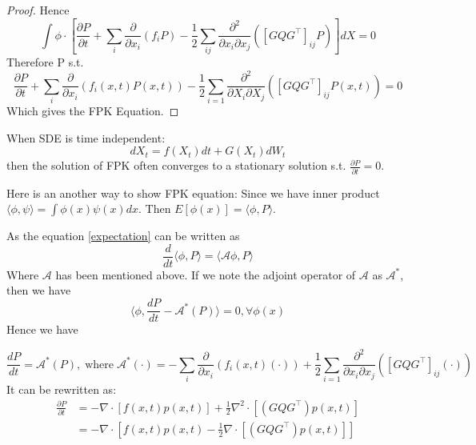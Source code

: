 \begin{proof}
    Hence $$\int \phi \cdot\left[\frac{\partial P}{\partial t}+\sum_{i} \frac{\partial}{\partial x_{i}}\left(f_{i} P\right)-\frac{1}{2} \sum_{i j} \frac{\partial^{2}}{\partial x_{i} \partial x_{j}}\left(\left[G Q G^{\top}\right]_{i j} P\right)\right] d X=0$$
    Therefore P s.t.    
    \begin{equation}
        \frac{\partial P}{\partial t}+\sum_{i} \frac{\partial}{\partial x_{i}}\left(f_{i}(x, t) P(x, t)\right)-\frac{1}{2} \sum_{i=1} \frac{\partial^{2}}{\partial X_{i} \partial X_{j}}\left(\left[G Q G^{\top}\right]_{i j} P\left(x,t\right)\right)=0
    \end{equation}
    Which gives the FPK Equation.
\end{proof}

\begin{remark}
    When SDE is time independent:  
    \begin{equation}
        d X_t=f(X_t) d t+G(X_t) d W_{t}  
    \end{equation}
    then the solution of FPK often converges to a stationary solution s.t.  $\frac{\partial P}{\partial t}=0$.
\end{remark}
Here is an another way to show FPK equation: Since we have inner product $\langle\phi, \psi\rangle=\int \phi(x)\psi(x)dx$. Then $E[\phi(x)]=\langle\phi, P\rangle$.

As the equation \ref{expectation} can be written as 
\begin{equation}
    \frac{d}{dt}\langle\phi, P\rangle=\langle\mathcal{A}\phi, P\rangle
\end{equation}
Where $\mathcal{A}$ has been mentioned above. If we note the adjoint operator of $\mathcal{A}$ as $\mathcal{A}^*$, then we have
\begin{equation}
    \langle\phi, \frac{dP}{dt}-\mathcal{A}^*(P)\rangle=0,\forall \phi(x)
\end{equation}
Hence we have 
\begin{theorem}
    \begin{equation}
    \frac{dP}{dt}=\mathcal{A}^*(P),\operatorname{where} \mathcal{A}^*(\cdot)=-\sum_{i} \frac{\partial}{\partial x_{i}}\left(f_{i}(x, t) (\cdot)\right)+\frac{1}{2} \sum_{i=1} \frac{\partial^{2}}{\partial x_{i} \partial x_{j}}\left(\left[G Q G^{\top}\right]_{i j}(\cdot)\right)
\end{equation}
It can be rewritten as:
\begin{equation}
    \begin{aligned}
        \frac{\partial P}{\partial t} &= -\nabla\cdot\left[f(x, t) p(x, t)\right]+\frac{1}{2} \nabla^2\cdot\left[\left(G Q G^{\top}\right) p(x, t)\right] \\
        &=-\nabla\cdot\left[f(x, t) p(x, t)-\frac{1}{2} \nabla\cdot\left[\left(G Q G^{\top}\right) p(x, t)\right]\right]
    \end{aligned}
\end{equation}
\end{theorem}

